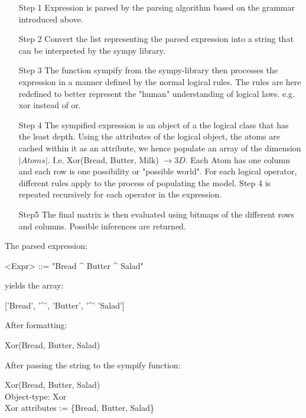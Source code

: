 \documentclass{scrartcl}
\begin{document}
\begin{enumerate}
    \item [Step 1] Expression is parsed by the parsing algorithm based on the
        grammar introduced above.\\
    \item [Step 2] Convert the list representing the parsed expression into a
        string that can be interpreted by the sympy library.\\
    \item [Step 3] The function sympify from the sympy-library then processes
        the expression in a manner defined by the normal logical rules. The
        rules are here redefined to better represent the "human" understanding
        of logical laws. e.g. xor instead of or.\\
    \item [Step 4] The sympified expression is an object of a the logical class
        that has the least depth.
        Using the attributes of the logical object, the atoms are cached within
        it as an attribute, we hence populate an array of the dimension $|Atoms|$.
        I.e. Xor(Bread, Butter, Milk) $\to 3 D$.
        Each Atom has one column and each row is one possibility or "possible world".
        For each logical operator, different rules apply to the process of populating the model.
        Step 4 is repeated recursively for each operator in the expression.
    \item [Step5] The final matrix is then evaluated using bitmaps of the different rows and columns.
        Possible inferences are returned.
\end{enumerate}


The parsed expression:
\begin{grammar}
    <Expr> ::= "Bread ^ Butter ^ Salad"
\end{grammar}   
yields the array:
\begin{center}
    ['Bread', '\^{}', 'Butter', '\^{}' 'Salad']
\end{center}
After formatting: 
\begin{center}
Xor(Bread, Butter, Salad)
\end{center}
After passing the string to the sympify function:
\begin{center}
 Xor(Bread, Butter, Salad)\\
Object-type: Xor\\
    Xor \to attributes := \{Bread, Butter, Salad\}\\
\end{center}
\end{document}
